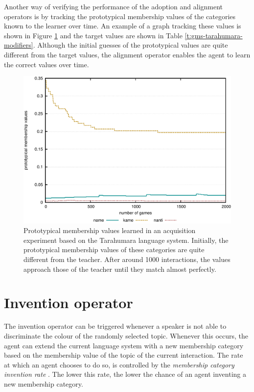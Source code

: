 Another way of verifying the performance of the adoption and alignment
operators is by tracking the prototypical membership values of the
categories known to the learner over time. An example of a graph tracking these values
is shown in Figure \ref{f:gm-acquisition-values} and the target values
are shown in Table \ref{t:gms-tarahumara-modifiers}. Although the
initial guesses of the prototypical values are quite different from
the target values, the alignment operator enables the agent to learn
the correct values over time.

\begin{figure}[htpb]
  \begin{center}
    \includegraphics[width=.8\textwidth]{./graded-membership/figures/strict-acquisition-values.pdf}
    \caption[Prototypical membership values learned in an acquisition
    experiment]{Prototypical membership values learned in an
      acquisition experiment based on the Tarahumara language
      system. Initially, the prototypical membership values of these
      categories are quite different from the teacher. After around
      1000 interactions, the values approach those of the teacher
      until they match almost perfectly.}
    \label{f:gm-acquisition-values}
  \end{center}
\end{figure}

\section{Invention operator}

The invention operator 
can be triggered whenever a
speaker is not able to discriminate the colour of the randomly selected
topic. Whenever this occurs, the agent can extend the current language
system with a new membership category based on the membership value
of the topic of the current interaction. The rate at which an agent
chooses to do so, is controlled by the \emph{membership category
  invention rate}
.
The lower this rate, the lower the chance of an agent inventing a new
membership category.

